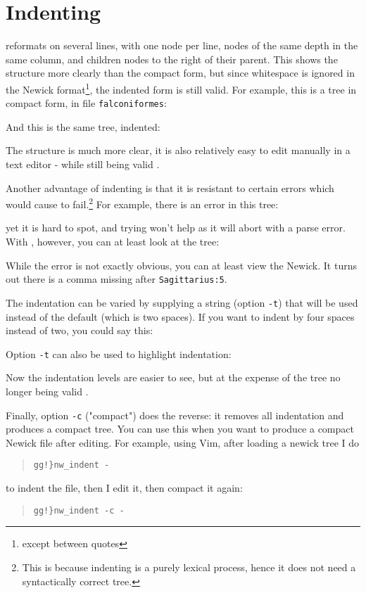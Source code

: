 
\section{Indenting}
\label{sct_indent}

\nwindent{} reformats \nw{} on several lines, with one node per line,
nodes of the same depth in the same column, and children nodes to the right of
their parent. This shows the structure more
clearly than the compact form, but since whitespace is ignored in the Newick
format\footnote{except between quotes}, the
indented form is still valid. For example, this is a tree in compact form, in
file \texttt{falconiformes}:

And this is the same tree, indented:
\begin{samepage}


\end{samepage}
The structure is much more clear, it is also relatively easy to edit manually
in a text editor - while still being valid \nw.

Another advantage of indenting is that it is resistant to certain errors
which would cause \display{} to fail.\footnote{This is
because indenting is a purely lexical process, hence it does not need a
syntactically correct tree.} For example, there is an error in this tree:

yet it is hard to spot, and trying \display{} won't help as it will abort with a
parse error. With \nwindent{}, however, you can at least look at the tree:
\begin{samepage}

\end{samepage}
While the error is not exactly obvious, you can at least view the Newick. It turns out there is a comma missing after \texttt{Sagittarius:5}.

The indentation can be varied by supplying a string (option \texttt{-t}) that
will be used instead of the default (which is two spaces). If you want to
indent by four spaces instead of two, you could say this:
\begin{samepage}


\end{samepage}
Option \texttt{-t} can also be used to highlight indentation:
\begin{samepage}


\end{samepage}
Now the indentation levels are easier to see, but at the expense of the tree no
longer being valid \nw.

Finally, option \texttt{-c} ("compact") does the reverse: it removes all
indentation and produces a compact tree. You can use this when you want to
produce a compact Newick file after editing. For example, using Vim, after
loading a newick tree I do 
\begin{quote}
\verb+gg!}nw_indent -+
\end{quote}
to indent the file, then I edit it, then compact it again:
\begin{quote}
\verb+gg!}nw_indent -c -+
\end{quote}

